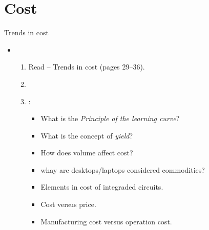 \section{Cost}

\begin{frame}[t]{Trends in cost}
\begin{itemize}
  \item {}
    \begin{enumerate}
      \item Read  -- Trends in cost (pages 29--36).
        \item \bibhennessy

      \item {}:
        \begin{itemize}
          \item What is the \emph{Principle of the learning curve}?
          \item What is the concept of \emph{yield}?
          \item How does volume affect cost?
          \item whay are desktops/laptops considered commodities?
          \item Elements in cost of integraded circuits.
          \item Cost versus price.
          \item Manufacturing cost versus operation cost.
        \end{itemize}
    \end{enumerate}
\end{itemize}
\end{frame}
